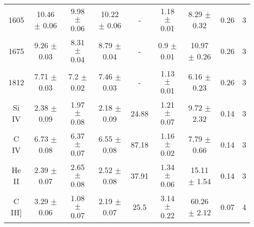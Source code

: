 \documentclass[
  man,floatsintext]{apa6}
\begin{document}
\begin{landscape}
\begin{longtable}{@{\extracolsep{\fill}} cc cc cc cc c}
    1605    &   10.46   $\pm$   0.06    &   9.98    $\pm$   0.06    &   10.22   $\pm$   0.06    &   -   &   1.18    $\pm$   0.01    &   8.29    $\pm$   0.32    &   0.26    &   3   \\  
                                                                                                                
    1675    &   9.26    $\pm$   0.03    &   8.31    $\pm$   0.04    &   8.79    $\pm$   0.04    &   -   &   0.9 $\pm$   0.01    &   10.97   $\pm$   0.26    &   0.26    &   3   \\  
                                                                                        
    1812    &   7.71    $\pm$   0.03    &   7.2 $\pm$   0.02    &   7.46    $\pm$   0.03    &   -   &   1.13    $\pm$   0.01    &   6.16    $\pm$   0.23    &   0.26    &   3   \\  
                                                                                                                
    Si IV   &   2.38    $\pm$   0.09    &   1.97    $\pm$   0.08    &   2.18    $\pm$   0.09    &   24.88   &   1.21    $\pm$   0.07    &   9.72    $\pm$   2.32    &   0.14    &   3   \\  
                                                                                                                    
    C IV    &   6.73    $\pm$   0.08    &   6.37    $\pm$   0.07    &   6.55    $\pm$   0.08    &   87.18   &   1.16    $\pm$   0.02    &   7.79    $\pm$   0.66    &   0.14    &   3   \\  
                                                                                                                    
    He II   &   2.39    $\pm$   0.07    &   2.65    $\pm$   0.08    &   2.52    $\pm$   0.08    &   37.91   &   1.34    $\pm$   0.06    &   15.11   $\pm$   1.54    &   0.14    &   3   \\  
                                                                                                                    
    C III]  &   3.29    $\pm$   0.06    &   1.08    $\pm$   0.07    &   2.19    $\pm$   0.07    &   25.5    &   3.14    $\pm$   0.22    &   60.26   $\pm$   2.12    &   0.07    &   4   \\  \hline\hline
                                                                                                                    

\end{longtable}
\end{landscape}
\end{document}
